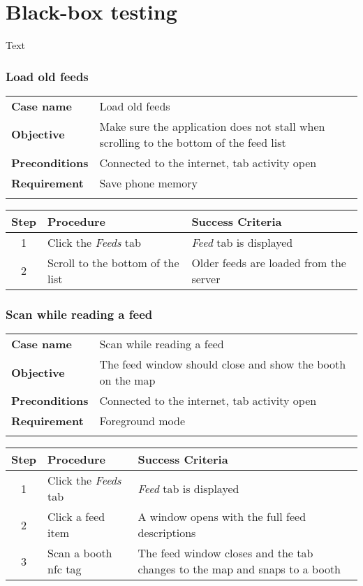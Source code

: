\section{Black-box testing}
Text

\newcommand{\testcase}[4]
{
\subsubsection*{#1}
\begin{center}
\begin{tabular}{p{1.8cm} p{8.52cm}}
\hline
\textbf{Case name} & #1\\
\textbf{Objective} & #2\\
\textbf{Preconditions} & #3\\
\textbf{Requirement} & #4\\
\hline
\\
\end{tabular}
\end{center}
}

\newcommand{\casetwo}{Load old feeds}
\newcommand{\casethree}{Scan while reading a feed}
\newcommand{\casefour}{Load new feeds}

\testcase
{\casetwo}
{Make sure the application does not stall when scrolling to the bottom of the feed list}
{Connected to the internet, tab activity open}
{Save phone memory}

\begin{center}
\begin{tabular}{| c | p{4.6cm} | p{4.6cm} |}
\hline
\textbf{Step} & \textbf{Procedure} & \textbf{Success Criteria}\\
\hline
1 & Click the \textit{Feeds} tab & \textit{Feed} tab is displayed\\
\hline
2 & Scroll to the bottom of the list & Older feeds are loaded from the server\\
\hline
\end{tabular}
\end{center}

\testcase
{\casethree}
{The feed window should close and show the booth on the map}
{Connected to the internet, tab activity open}
{Foreground mode}

\begin{center}
\begin{tabular}{| c | p{4.6cm} | p{4.6cm} |}
\hline
\textbf{Step} & \textbf{Procedure} & \textbf{Success Criteria}\\
\hline
1 & Click the \textit{Feeds} tab & \textit{Feed} tab is displayed\\
\hline
2 & Click a feed item & A window opens with the full feed descriptions\\
\hline
3 & Scan a booth \ac{nfc} tag & The feed window closes and the tab changes to the map and snaps to a booth\\
\hline
\end{tabular}
\end{center}

